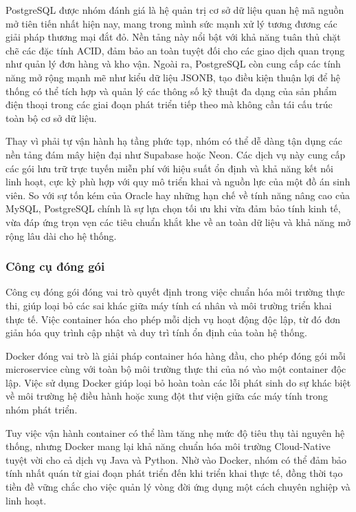 \vspace{-40pt}

PostgreSQL được nhóm đánh giá là hệ quản trị cơ sở dữ liệu quan hệ mã nguồn mở tiên tiến nhất hiện nay, mang trong mình sức mạnh xử lý tương đương các giải pháp thương mại đắt đỏ. Nền tảng này nổi bật với khả năng tuân thủ chặt chẽ các đặc tính ACID, đảm bảo an toàn tuyệt đối cho các giao dịch quan trọng như quản lý đơn hàng và kho vận. Ngoài ra, PostgreSQL còn cung cấp các tính năng mở rộng mạnh mẽ như kiểu dữ liệu JSONB, tạo điều kiện thuận lợi để hệ thống có thể tích hợp và quản lý các thông số kỹ thuật đa dạng của sản phẩm điện thoại trong các giai đoạn phát triển tiếp theo mà không cần tái cấu trúc toàn bộ cơ sở dữ liệu.

Thay vì phải tự vận hành hạ tầng phức tạp, nhóm có thể dễ dàng tận dụng các nền tảng đám mây hiện đại như Supabase hoặc Neon. Các dịch vụ này cung cấp các gói lưu trữ trực tuyến miễn phí với hiệu suất ổn định và khả năng kết nối linh hoạt, cực kỳ phù hợp với quy mô triển khai và nguồn lực của một đồ án sinh viên. So với sự tốn kém của Oracle hay những hạn chế về tính năng nâng cao của MySQL, PostgreSQL chính là sự lựa chọn tối ưu khi vừa đảm bảo tính kinh tế, vừa đáp ứng trọn vẹn các tiêu chuẩn khắt khe về an toàn dữ liệu và khả năng mở rộng lâu dài cho hệ thống.

\subsubsection{Công cụ đóng gói}

Công cụ đóng gói đóng vai trò quyết định trong việc chuẩn hóa môi trường thực thi, giúp loại bỏ các sai khác giữa máy tính cá nhân và môi trường triển khai thực tế. Việc container hóa cho phép mỗi dịch vụ hoạt động độc lập, từ đó đơn giản hóa quy trình cập nhật và duy trì tính ổn định của toàn hệ thống.

Docker đóng vai trò là giải pháp container hóa hàng đầu, cho phép đóng gói mỗi microservice cùng với toàn bộ môi trường thực thi của nó vào một container độc lập. Việc sử dụng Docker giúp loại bỏ hoàn toàn các lỗi phát sinh do sự khác biệt về môi trường hệ điều hành hoặc xung đột thư viện giữa các máy tính trong nhóm phát triển.

Tuy việc vận hành container có thể làm tăng nhẹ mức độ tiêu thụ tài nguyên hệ thống, nhưng Docker mang lại khả năng chuẩn hóa môi trường Cloud-Native tuyệt vời cho cả dịch vụ Java và Python. Nhờ vào Docker, nhóm có thể đảm bảo tính nhất quán từ giai đoạn phát triển đến khi triển khai thực tế, đồng thời tạo tiền đề vững chắc cho việc quản lý vòng đời ứng dụng một cách chuyên nghiệp và linh hoạt.

